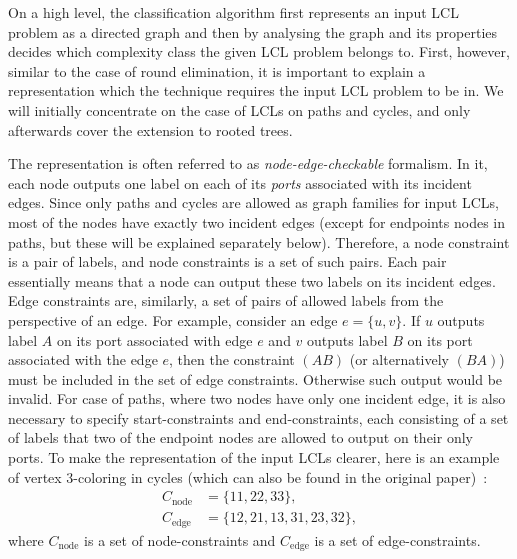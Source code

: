 On a high level, the classification algorithm first represents an input LCL problem as
a directed graph and then by analysing the graph and its properties decides
which complexity class the given LCL problem belongs to. First, however, similar to
the case of round elimination, it is important to explain a representation which
the technique requires the input LCL problem to be in. We will initially concentrate on the case
of LCLs on paths and cycles, and only afterwards cover the extension to rooted trees.

The representation is often referred to as \emph{node-edge-checkable} formalism.
In it, each node outputs one label on each of its \emph{ports} associated with
its incident edges. Since only paths and cycles are allowed as graph families for
input LCLs, most of the nodes have exactly two incident edges (except for endpoints nodes
in paths, but these will be explained separately below). Therefore, a node constraint
is a pair of labels, and node constraints is a set of such pairs. Each pair essentially
means that a node can output these two labels on its incident edges. Edge constraints are,
similarly, a set of pairs of allowed labels from the perspective of an edge. For example,
consider an edge $e = \{u, v\}$. If $u$ outputs label $A$ on its port associated with edge $e$
and $v$ outputs label $B$ on its port associated with the edge $e$, then the constraint $(AB)$
(or alternatively $(BA)$) must be included in the set of edge constraints. Otherwise such output
would be invalid. For case of paths, where two nodes have only one incident edge, it is also
necessary to specify start-constraints and end-constraints, each consisting of a set of labels
that two of the endpoint nodes are allowed to output on their only ports. To make the
representation of the input LCLs clearer, here is an example of vertex 3-coloring in cycles
(which can also be found in the original paper)~\cite{Chang2020}:
\begin{align*}
  C_{\textrm{node}} &= \{ 11, 22, 33 \}, \\
  C_{\textrm{edge}} &= \{ 12, 21, 13, 31, 23, 32 \},
\end{align*}
where $C_{\textrm{node}}$ is a set of node-constraints and $C_{\textrm{edge}}$ is a set of edge-constraints.

